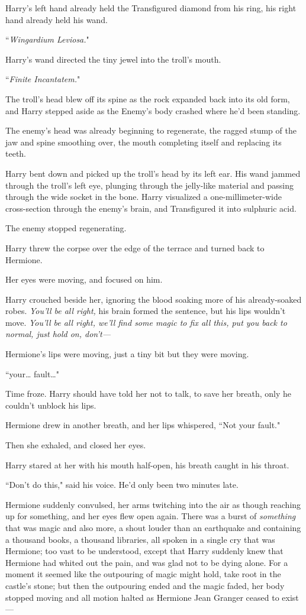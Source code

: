 Harry's left hand already held the Transfigured diamond from his ring, his right hand already held his wand.

``\emph{Wingardium Leviosa.}"

Harry's wand directed the tiny jewel into the troll's mouth.

``\emph{Finite Incantatem.}"

The troll's head blew off its spine as the rock expanded back into its old form, and Harry stepped aside as the Enemy's body crashed where he'd been standing.

The enemy's head was already beginning to regenerate, the ragged stump of the jaw and spine smoothing over, the mouth completing itself and replacing its teeth.

Harry bent down and picked up the troll's head by its left ear. His wand jammed through the troll's left eye, plunging through the jelly-like material and passing through the wide socket in the bone. Harry visualized a one-millimeter-wide cross-section through the enemy's brain, and Transfigured it into sulphuric acid.

The enemy stopped regenerating.

Harry threw the corpse over the edge of the terrace and turned back to Hermione.

Her eyes were moving, and focused on him.

Harry crouched beside her, ignoring the blood soaking more of his already-soaked robes. \emph{You'll be all right,} his brain formed the sentence, but his lips wouldn't move. \emph{You'll be all right, we'll find some magic to fix all this, put you back to normal, just hold on, don't---}

Hermione's lips were moving, just a tiny bit but they were moving.

``your{\ldots} fault{\ldots}"

Time froze. Harry should have told her not to talk, to save her breath, only he couldn't unblock his lips.

Hermione drew in another breath, and her lips whispered, ``Not your fault."

Then she exhaled, and closed her eyes.

Harry stared at her with his mouth half-open, his breath caught in his throat.

``Don't do this," said his voice. He'd only been two minutes late.

Hermione suddenly convulsed, her arms twitching into the air as though reaching up for something, and her eyes flew open again. There was a burst of \emph{something} that was magic and also more, a shout louder than an earthquake and containing a thousand books, a thousand libraries, all spoken in a single cry that was Hermione; too vast to be understood, except that Harry suddenly knew that Hermione had whited out the pain, and was glad not to be dying alone. For a moment it seemed like the outpouring of magic might hold, take root in the castle's stone; but then the outpouring ended and the magic faded, her body stopped moving and all motion halted as Hermione Jean Granger ceased to exist---

